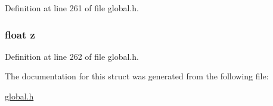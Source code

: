 Definition at line 261 of file global.\-h.

\hypertarget{structfloatVector3d_af73583b1e980b0aa03f9884812e9fd4d}{
\subsubsection[{z}]{\setlength{\rightskip}{0pt plus 5cm}float z}}\label{structfloatVector3d_af73583b1e980b0aa03f9884812e9fd4d}


Definition at line 262 of file global.\-h.



The documentation for this struct was generated from the following file\-:\begin{DoxyCompactItemize}
\item 
\hyperlink{global_8h}{global.\-h}\end{DoxyCompactItemize}
